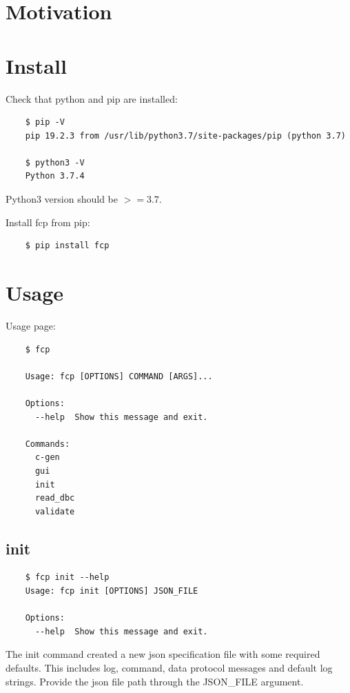 \documentclass[11pt, a4paper]{article}
\begin{document}
\section{Motivation}

\section{Install}
\label{sec:install}

\noindent Check that python and pip are installed:
\begin{verbatim}
	$ pip -V
	pip 19.2.3 from /usr/lib/python3.7/site-packages/pip (python 3.7)

	$ python3 -V
	Python 3.7.4
\end{verbatim}

Python3 version should be $>=3.7$.

Install fcp from pip:

\begin{verbatim}
	$ pip install fcp
\end{verbatim}

\section{Usage}
\label{sec:usage}

Usage page:
\begin{verbatim}
	$ fcp

	Usage: fcp [OPTIONS] COMMAND [ARGS]...

	Options:
	  --help  Show this message and exit.

	Commands:
	  c-gen
	  gui
	  init
	  read_dbc
	  validate
\end{verbatim}

\subsection{init}
\label{sec:usage:init}

\begin{verbatim}
	$ fcp init --help
	Usage: fcp init [OPTIONS] JSON_FILE

	Options:
	  --help  Show this message and exit.

\end{verbatim}

The init command created a new json specification file with some required
defaults. This includes log, command, data protocol messages and default log
strings. Provide the json file path through the JSON\_FILE argument. 
\end{document}
